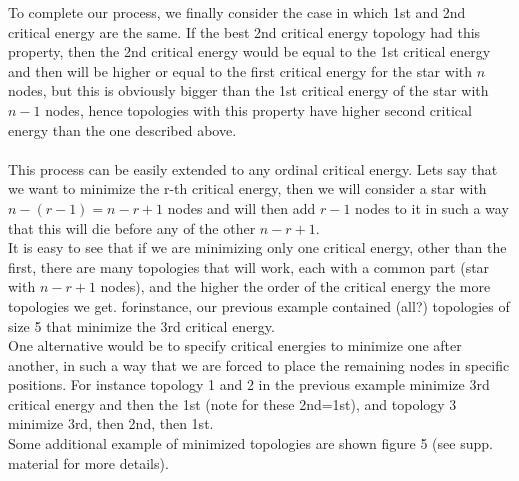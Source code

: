 \documentclass{amsart}
\theoremstyle{plain}
\numberwithin{equation}{section}
\begin{document}
To complete our process, we finally consider the case in which 1st and 2nd critical energy are the same. If the best 2nd critical energy topology had this property, then the 2nd critical energy would be equal to the 1st critical energy and then will be higher or equal to the first critical energy for the star with $n$ nodes, but this is obviously bigger than the 1st critical energy of the star with $n-1$ nodes, hence topologies with this property have higher second critical energy than the one described above.\\\\
This process can be easily extended to any ordinal critical energy. Lets say that we want to minimize the r-th critical energy, then we will consider a star with $n-(r-1)=n-r+1$ nodes and will then add $r-1$ nodes to it in such a way that this will die before any of the other $n-r+1$.\\
It is easy to see that if we are minimizing only one critical energy, other than the first, there are many topologies that will work, each with a common part (star with $n-r+1$ nodes), and the higher the order of the critical energy the more topologies we get. forinstance, our previous example contained (all?) topologies of size 5 that minimize the 3rd critical energy.\\
One alternative would be to specify critical energies to minimize one after another, in such a way that we are forced to place the remaining nodes in specific positions. For instance topology 1 and 2 in the previous example minimize 3rd critical energy and then the 1st (note for these 2nd=1st), and topology 3 minimize 3rd, then 2nd, then 1st.\\ Some additional example of minimized topologies are shown figure 5 (see supp. material for more details).\\\\
\end{document}
